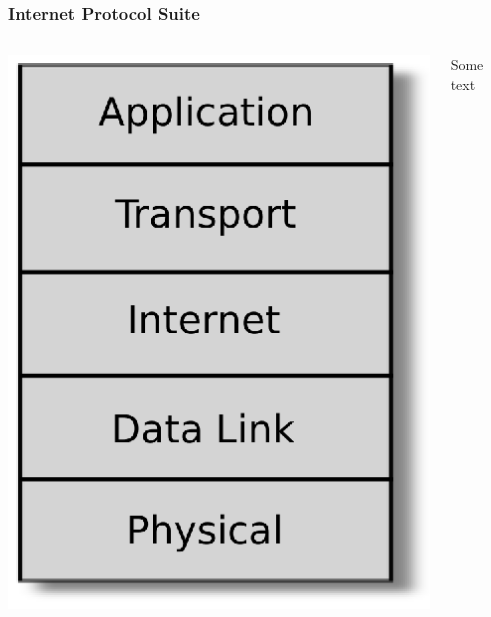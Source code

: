 \documentclass{beamer}
\begin{document}
\begin{frame}
  \frametitle{Internet Protocol Suite}
\begin{columns}

 \begin{column}{0.5\textwidth} 
  \begin{center}
  \includegraphics[scale=0.5]{tcpip_stack}
  \end{center}
  \end{column}

 \begin{column}{0.5\textwidth} 
 Some text
  
\end{column}
\end{columns}

\end{frame}
\end{document}
